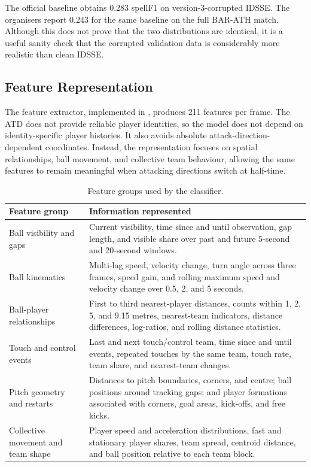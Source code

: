 \documentclass[11pt,a4paper]{article}
\begin{document}
The official  baseline obtains 0.283 spellF1 on version-3-corrupted IDSSE. The organisers report 0.243 for the same baseline on the full BAR-ATH match. Although this does not prove that the two distributions are identical, it is a useful sanity check that the corrupted validation data is considerably more realistic than clean IDSSE.

\subsection{Feature Representation}

The feature extractor, implemented in , produces 211 features per frame. The ATD does not provide reliable player identities, so the model does not depend on identity-specific player histories. It also avoids absolute attack-direction-dependent coordinates. Instead, the representation focuses on spatial relationships, ball movement, and collective team behaviour, allowing the same features to remain meaningful when attacking directions switch at half-time.

\begin{table}[H]
\centering
\small
\caption{Feature groups used by the classifier.}

\begin{tabularx}{\textwidth}{L{0.25\textwidth} Y}
\toprule
\textbf{Feature group} & \textbf{Information represented} \\
\midrule

Ball visibility and gaps
&
Current visibility, time since and until observation, gap length, and visible share over past and future 5-second and 20-second windows.
\\

Ball kinematics
&
Multi-lag speed, velocity change, turn angle across three frames, speed gain, and rolling maximum speed and velocity change over 0.5, 2, and 5 seconds.
\\

Ball-player relationships
&
First to third nearest-player distances, counts within 1, 2, 5, and 9.15 metres, nearest-team indicators, distance differences, log-ratios, and rolling distance statistics.
\\

Touch and control events
&
Last and next touch/control team, time since and until events, repeated touches by the same team, touch rate, team share, and nearest-team changes.
\\

Pitch geometry and restarts
&
Distances to pitch boundaries, corners, and centre; ball positions around tracking gaps; and player formations associated with corners, goal areas, kick-offs, and free kicks.
\\

Collective movement and team shape
&
Player speed and acceleration distributions, fast and stationary player shares, team spread, centroid distance, and ball position relative to each team block.
\\

\bottomrule
\end{tabularx}
\end{table}
\end{document}
